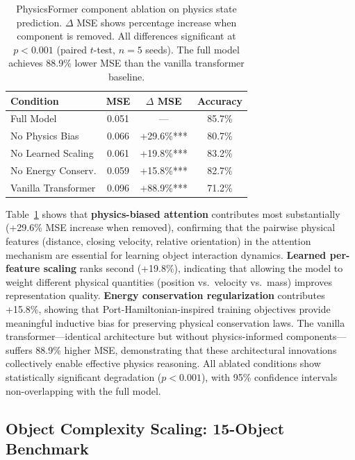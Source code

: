 \documentclass[conference]{IEEEtran}
\theoremstyle{plain}
\theoremstyle{definition}
\theoremstyle{remark}
\begin{document}
\begin{table}[h]
\centering
\footnotesize
\begin{tabular*}{\columnwidth}{@{\extracolsep{\fill}}lccc@{}}
\toprule
\textbf{Condition} & \textbf{MSE} & \textbf{$\Delta$ MSE} & \textbf{Accuracy} \\
\midrule
Full Model & 0.051 & --- & 85.7\% \\
No Physics Bias & 0.066 & +29.6\%*** & 80.7\% \\
No Learned Scaling & 0.061 & +19.8\%*** & 83.2\% \\
No Energy Conserv. & 0.059 & +15.8\%*** & 82.7\% \\
Vanilla Transformer & 0.096 & +88.9\%*** & 71.2\% \\
\bottomrule
\end{tabular*}
\caption{PhysicsFormer component ablation on physics state prediction. $\Delta$ MSE shows percentage increase when component is removed. All differences significant at $p<0.001$ (paired $t$-test, $n=5$ seeds). The full model achieves 88.9\% lower MSE than the vanilla transformer baseline.}
\label{tab:physicsformer_ablation}
\end{table}

Table~\ref{tab:physicsformer_ablation} shows that \textbf{physics-biased attention} contributes most substantially (+29.6\% MSE increase when removed), confirming that the pairwise physical features (distance, closing velocity, relative orientation) in the attention mechanism are essential for learning object interaction dynamics. \textbf{Learned per-feature scaling} ranks second (+19.8\%), indicating that allowing the model to weight different physical quantities (position vs.\ velocity vs.\ mass) improves representation quality. \textbf{Energy conservation regularization} \cite{desai2024phmarl,greydanus2019hamiltonian} contributes +15.8\%, showing that Port-Hamiltonian-inspired training objectives provide meaningful inductive bias for preserving physical conservation laws. The vanilla transformer---identical architecture but without physics-informed components---suffers 88.9\% higher MSE, demonstrating that these architectural innovations collectively enable effective physics reasoning. All ablated conditions show statistically significant degradation ($p<0.001$), with 95\% confidence intervals non-overlapping with the full model.

\subsection{Object Complexity Scaling: 15-Object Benchmark}
\end{document}
